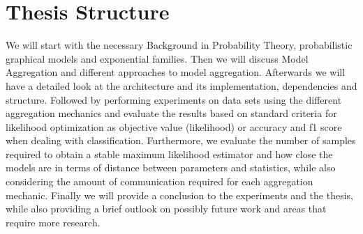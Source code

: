 \section{Thesis Structure}

We will start with the necessary Background in Probability Theory, probabilistic graphical models and exponential families.
Then we will discuss Model Aggregation and different approaches to model aggregation. 
Afterwards we will have a detailed look at the architecture and its implementation, dependencies and structure.
Followed by performing experiments on data sets using the different aggregation mechanics and evaluate the results based on standard criteria for likelihood optimization as objective value (likelihood) or accuracy and f1 score when dealing with classification. 
Furthermore, we evaluate the number of samples required to obtain a stable maximum likelihood estimator and how close the models are in terms of distance between parameters and statistics, while also considering the amount of communication required for each aggregation mechanic.
Finally we will provide a conclusion to the experiments and the thesis, while also providing a brief outlook on possibly future work and areas that require more research.
